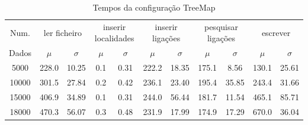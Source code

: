 \documentclass[a5paper,twocolumn, 11pt]{article}
\begin{document}
\clearpage
\onecolumn
    \begin{table}[h!b!t!]
    \begin{center}
    \caption{Tempos da configuração TreeMap}
\begin{tabular}{ | *{11}{c|} }
\hline
    Num. & \multicolumn{2}{|c|}{ler ficheiro} & \multicolumn{2}{|c|}{inserir localidades} & \multicolumn{2}{|c|}{inserir ligações} & \multicolumn{2}{|c|}{pesquisar ligações} & \multicolumn{2}{|c|}{escrever}\\ %
    
    Dados & $\mu$ & $\sigma$ & $\mu$ & $\sigma$ & $\mu$ & $\sigma$ & $\mu$ & $\sigma$ & $\mu$ & $\sigma$\\ \hline
    5000 & 228.0 & 10.25 & 0.1 & 0.31 & 222.2 & 18.35 & 175.1 & 8.56 & 130.1 & 25.61\\ \hline
    10000 & 301.5 & 27.84 & 0.2 & 0.42 & 236.1 & 23.40 & 195.4 & 35.85 & 243.4 & 31.66\\ \hline
    15000 & 406.9 & 34.89 & 0.1 & 0.31 & 244.0 & 56.44 & 181.7 & 11.54 & 465.1 & 85.71\\ \hline
    18000 & 470.3 & 56.07 & 0.3 & 0.48 & 231.9 & 17.99 & 174.9 & 17.29 & 670.0 & 36.04\\ \hline
\end{tabular}
\end{center}
\end{table}
\end{document}
